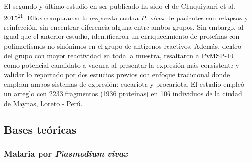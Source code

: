 \documentclass[a4paper]{article}
\begin{document}
\begin{enumerate}
  El segundo y último estudio en ser publicado ha sido el de Chuquiyauri
  et al.
  2015\textsuperscript{\protect\hyperlink{ref-chuquiyauri2015vivax}{21}}.
  Ellos compararon la respuesta contra \emph{P. vivax} de pacientes con
  relapsos y reinfección, sin encontrar diferencia alguna entre ambos
  grupos. Sin embargo, al igual que el anterior estudio, identificaron
  un enriquecimiento de proteínas con polimorfismos no-sinónimos en el
  grupo de antígenos reactivos. Además, dentro del grupo con mayor
  reactividad en toda la muestra, resaltaron a PvMSP-10 como potencial
  candidato a vacuna al presentar la expresión más consistente y validar
  lo reportado por dos estudios previos con enfoque tradicional donde
  emplean ambos sistemas de expresión: eucariota y procariota. El
  estudio empleó un arreglo con 2233 fragmentos (1936 proteínas) en 106
  individuos de la ciudad de Maynas, Loreto - Perú.
\end{enumerate}

\subsection{Bases teóricas}\label{bases-teoricas}

\subsubsection{\texorpdfstring{Malaria por \emph{Plasmodium
vivax}}{Malaria por Plasmodium vivax}}\label{malaria-por-plasmodium-vivax}
\end{document}
